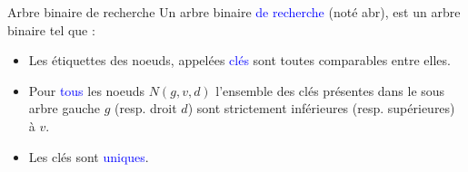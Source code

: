\documentclass[10pt]{beamer}
\begin{document}
\begin{frame}[fragile]{\Ctitle}{\stitle}
	\begin{alertblock}{Arbre binaire de recherche}
		Un arbre binaire \textcolor{blue}{de recherche} (noté {\sc abr}), est un arbre binaire tel que :
		\begin{itemize}
			\item<2-> Les étiquettes des noeuds, appelées \textcolor{blue}{clés} sont toutes comparables entre elles. \\
				\onslide<4->{\textcolor{gray}{Par exemple, les étiquettes sont toutes des nombres ou encore des chaines de caractères (comparées par ordre alphabétique).}}
			\item<5-> Pour \textcolor{blue}{tous} les noeuds $N(g,v,d)$ l'ensemble des clés présentes dans le sous arbre gauche $g$ (resp. droit $d$) sont strictement inférieures (resp. supérieures) à $v$.\\
				\item<6->{Les clés sont \textcolor{blue}{uniques}.}
		\end{itemize}
	\end{alertblock}
\end{frame}
\end{document}
